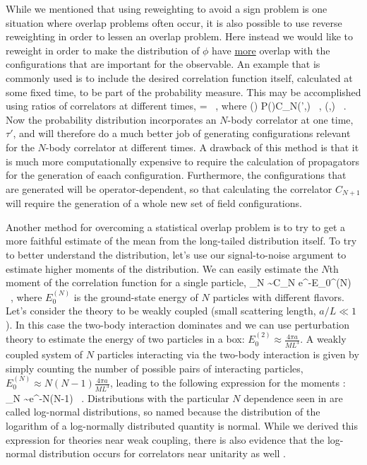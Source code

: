 While we mentioned that using reweighting to avoid a sign problem is one situation where overlap problems often occur, it is also possible to use reverse reweighting in order to lessen an overlap problem. Here instead we would like to reweight in order to make the distribution of $\phi$ have \underline{more} overlap with the configurations that are important for the observable. An example that is commonly used is to include the desired correlation function itself, calculated at some fixed time, to be part of the probability measure. This may be accomplished using ratios of correlators at different times,
\beq
{} =  \ ,
\eeq
where
\beq
{}(\phi) \equiv P(\phi)C_N(\tau',\phi) \ , \qquad {}(\phi,\tau) \equiv {} \ .
\eeq
Now the probability distribution incorporates an $N$-body correlator at one time, $\tau'$, and will therefore do a much better job of generating configurations relevant for the $N$-body correlator at different times. A drawback of this method is that it is much more computationally expensive to require the calculation of propagators for the generation of eaach configuration. Furthermore, the configurations that are generated will be operator-dependent, so that calculating the correlator $C_{N+1}$ will require the generation of a whole new set of field configurations.

Another method for overcoming a statistical overlap problem is to try to get a more faithful estimate of the mean from the long-tailed distribution itself. To try to better understand the distribution, let's use our signal-to-noise argument to estimate higher moments of the distribution. We can easily estimate the $N$th moment of the correlation function for a single particle,
\beq
{}_N \sim C_{N} \underset{\tau\to\infty}{\sim} e^{-E_0^{(N)}\tau} \ ,
\eeq
where $E_0^{(N)}$ is the ground-state energy of $N$ particles with different flavors. Let's consider the theory to be weakly coupled (small scattering length, $a/L \ll 1$). In this case the two-body interaction dominates and we can use perturbation theory to estimate the energy of two particles in a box: $E_0^{(2)} \approx \frac{4\pi a}{ML^3}$. A weakly coupled system of $N$ particles interacting via the two-body interaction is given by simply counting the number of possible pairs of interacting particles, $E_0^{(N)} \approx N(N-1) \frac{4\pi a}{ML^3}$, leading to the following expression for the moments \cite{DeGrand:2012ik}:
\beq
\label{eq:lnmoments}
{}_N \sim e^{-N(N-1) } \ .
\eeq
Distributions with the particular $N$ dependence seen in  are called log-normal distributions, so named because the distribution of the logarithm of a log-normally distributed quantity is normal. While we derived this expression for theories near weak coupling, there is also evidence that the log-normal distribution occurs for correlators near unitarity as well \cite{Nicholson:2012zp,Nicholson:2015zxa}. 

